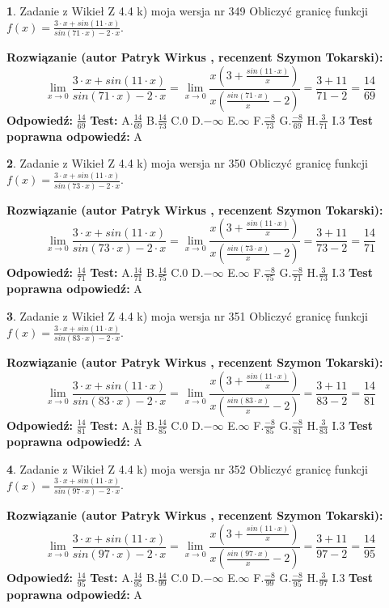 \documentclass[12pt, a4paper]{article}
\theoremstyle{definition} %
\newtheorem{zad}{}
\newcommand{\zadStart}[1]{\begin{zad}#1\newline}
\newcommand{\zadStop}{\end{zad}}
\newcommand{\rozwStart}[2]{\noindent \textbf{Rozwiązanie (autor #1 , recenzent #2): }\newline}
\newcommand{\rozwStop}{\newline}
\newcommand{\odpStart}{\noindent \textbf{Odpowiedź:}\newline}
\newcommand{\odpStop}{\newline}
\newcommand{\testStart}{\noindent \textbf{Test:}\newline}
\newcommand{\testStop}{\newline}
\newcommand{\kluczStart}{\noindent \textbf{Test poprawna odpowiedź:}\newline}
\newcommand{\kluczStop}{\newline}
\begin{document}
\zadStart{Zadanie z Wikieł Z 4.4 k) moja wersja nr 349}
Obliczyć granicę funkcji $f(x)=\frac{3\cdot x +sin(11\cdot x)}{sin(71\cdot x) -2\cdot x}$.
\zadStop
\rozwStart{Patryk Wirkus}{Szymon Tokarski}
$$\lim\limits_{x\to 0}\frac{3\cdot x +sin(11\cdot x)}{sin(71\cdot x) -2\cdot x}
=\lim\limits_{x\to 0}\frac{x(3+\frac{sin(11\cdot x)}{x})}{x(\frac{sin(71\cdot x)}{x}-2)}
=\frac{3+11}{71-2} = \frac{14}{69}$$
\rozwStop
\odpStart
$\frac{14}{69}$
\odpStop
\testStart
A.$\frac{14}{69}$
B.$\frac{14}{73}$
C.$0$
D.$-\infty$
E.$\infty$
F.$\frac{-8}{73}$
G.$\frac{-8}{69}$
H.$\frac{3}{71}$
I.$3$
\testStop
\kluczStart
A
\kluczStop



\zadStart{Zadanie z Wikieł Z 4.4 k) moja wersja nr 350}
Obliczyć granicę funkcji $f(x)=\frac{3\cdot x +sin(11\cdot x)}{sin(73\cdot x) -2\cdot x}$.
\zadStop
\rozwStart{Patryk Wirkus}{Szymon Tokarski}
$$\lim\limits_{x\to 0}\frac{3\cdot x +sin(11\cdot x)}{sin(73\cdot x) -2\cdot x}
=\lim\limits_{x\to 0}\frac{x(3+\frac{sin(11\cdot x)}{x})}{x(\frac{sin(73\cdot x)}{x}-2)}
=\frac{3+11}{73-2} = \frac{14}{71}$$
\rozwStop
\odpStart
$\frac{14}{71}$
\odpStop
\testStart
A.$\frac{14}{71}$
B.$\frac{14}{75}$
C.$0$
D.$-\infty$
E.$\infty$
F.$\frac{-8}{75}$
G.$\frac{-8}{71}$
H.$\frac{3}{73}$
I.$3$
\testStop
\kluczStart
A
\kluczStop



\zadStart{Zadanie z Wikieł Z 4.4 k) moja wersja nr 351}
Obliczyć granicę funkcji $f(x)=\frac{3\cdot x +sin(11\cdot x)}{sin(83\cdot x) -2\cdot x}$.
\zadStop
\rozwStart{Patryk Wirkus}{Szymon Tokarski}
$$\lim\limits_{x\to 0}\frac{3\cdot x +sin(11\cdot x)}{sin(83\cdot x) -2\cdot x}
=\lim\limits_{x\to 0}\frac{x(3+\frac{sin(11\cdot x)}{x})}{x(\frac{sin(83\cdot x)}{x}-2)}
=\frac{3+11}{83-2} = \frac{14}{81}$$
\rozwStop
\odpStart
$\frac{14}{81}$
\odpStop
\testStart
A.$\frac{14}{81}$
B.$\frac{14}{85}$
C.$0$
D.$-\infty$
E.$\infty$
F.$\frac{-8}{85}$
G.$\frac{-8}{81}$
H.$\frac{3}{83}$
I.$3$
\testStop
\kluczStart
A
\kluczStop



\zadStart{Zadanie z Wikieł Z 4.4 k) moja wersja nr 352}
Obliczyć granicę funkcji $f(x)=\frac{3\cdot x +sin(11\cdot x)}{sin(97\cdot x) -2\cdot x}$.
\zadStop
\rozwStart{Patryk Wirkus}{Szymon Tokarski}
$$\lim\limits_{x\to 0}\frac{3\cdot x +sin(11\cdot x)}{sin(97\cdot x) -2\cdot x}
=\lim\limits_{x\to 0}\frac{x(3+\frac{sin(11\cdot x)}{x})}{x(\frac{sin(97\cdot x)}{x}-2)}
=\frac{3+11}{97-2} = \frac{14}{95}$$
\rozwStop
\odpStart
$\frac{14}{95}$
\odpStop
\testStart
A.$\frac{14}{95}$
B.$\frac{14}{99}$
C.$0$
D.$-\infty$
E.$\infty$
F.$\frac{-8}{99}$
G.$\frac{-8}{95}$
H.$\frac{3}{97}$
I.$3$
\testStop
\kluczStart
A
\kluczStop
\end{document}
